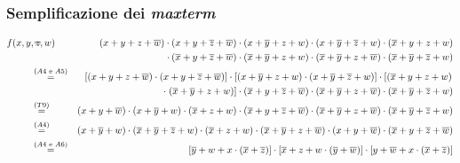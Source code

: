 \documentclass[a4paper]{extarticle}
\begin{document}
\subsubsection{Semplificazione dei \emph{maxterm}}
\begin{eqnarray*}
  f(x,y,z,w) \hspace{-2.5em} &=& \left(x + y + z + \overline{w}\right) \cdot \left(x + y + \overline{z} + \overline{w}\right) \cdot \left(x + \overline{y} + z + w\right) \cdot \left(x + \overline{y} + \overline{z} + w\right) \cdot \left(\overline{x} + y + z + w\right)\\
  & & \cdot \left(\overline{x} + y + \overline{z} + \overline{w}\right) \cdot \left(\overline{x} + \overline{y} + z + w\right) \cdot \left(\overline{x} + \overline{y} + z + \overline{w}\right) \cdot \left(\overline{x} + \overline{y} + \overline{z} + w\right)\\
  &\overset{\left(A4 \text{ e } A5\right)}{=}& \left[\left(x + y + z + \overline{w}\right) \cdot \left(x + y + \overline{z} + \overline{w}\right) \right] \cdot \left[\left(x + \overline{y} + z + w\right) \cdot \left(x + \overline{y} + \overline{z} + w\right) \right] \cdot \left[\left(\overline{x} + y + z + w\right)\right.\\
  & & \cdot \left.\left(\overline{x} + \overline{y} + z + w\right) \right] \cdot \left(\overline{x} + y + \overline{z} + \overline{w}\right) \cdot \left(\overline{x} + \overline{y} + z + \overline{w}\right) \cdot \left(\overline{x} + \overline{y} + \overline{z} + w\right)\\
  &\overset{\left(T9\right)}{=}& \left(x + y + \overline{w}\right) \cdot \left(x + \overline{y} + w\right) \cdot \left(\overline{x} + z + w\right) \cdot \left(\overline{x} + y + \overline{z} + \overline{w}\right) \cdot \left(\overline{x} + \overline{y} + z + \overline{w}\right) \cdot \left(\overline{x} + \overline{y} + \overline{z} + w\right)\\
  &\overset{\left(A4\right)}{=}& \left(x + \overline{y} + w\right) \cdot \left(\overline{x} + \overline{y} + \overline{z} + w\right) \cdot \left(\overline{x} + z + w\right) \cdot \left(\overline{x} + \overline{y} + z + \overline{w}\right) \cdot \left(x + y + \overline{w}\right) \cdot \left(\overline{x} + y + \overline{z} + \overline{w}\right)\\
  &\overset{\left(A4 \text{ e } A6\right)}{=}& \left[\overline{y} + w + x \cdot \left(\overline{x} + \overline{z}\right) \right] \cdot \left[\overline{x} + z + w \cdot \left( \overline{y} + \overline{w}\right) \right] \cdot \left[y + \overline{w} + x \cdot \left(\overline{x} + \overline{z} \right)\right]\\

\end{eqnarray*}
\end{document}
